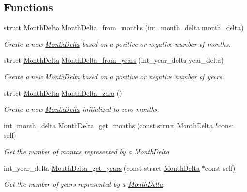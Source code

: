 \subsection*{\-Functions}
\begin{DoxyCompactItemize}
\item 
struct \hyperlink{structMonthDelta}{\-Month\-Delta} \hyperlink{month-delta_8h_ab2435ae92655bed23406d37b4b8f4750}{\-Month\-Delta\-\_\-from\-\_\-months} (int\-\_\-month\-\_\-delta month\-\_\-delta)
\begin{DoxyCompactList}\small\item\em \-Create a new \hyperlink{structMonthDelta}{\-Month\-Delta} based on a positive or negative number of months. \end{DoxyCompactList}\item 
struct \hyperlink{structMonthDelta}{\-Month\-Delta} \hyperlink{month-delta_8h_aec5607ad9e7e090c39b2f50a68974ef0}{\-Month\-Delta\-\_\-from\-\_\-years} (int\-\_\-year\-\_\-delta year\-\_\-delta)
\begin{DoxyCompactList}\small\item\em \-Create a new \hyperlink{structMonthDelta}{\-Month\-Delta} based on a positive or negative number of years. \end{DoxyCompactList}\item 
struct \hyperlink{structMonthDelta}{\-Month\-Delta} \hyperlink{month-delta_8h_aca81ef97d8ec1cd052ab391636f16bf7}{\-Month\-Delta\-\_\-zero} ()
\begin{DoxyCompactList}\small\item\em \-Create a new \hyperlink{structMonthDelta}{\-Month\-Delta} initialized to zero months. \end{DoxyCompactList}\item 
int\-\_\-month\-\_\-delta \hyperlink{month-delta_8h_aa01811194746354457e2b5e7a70dd59d}{\-Month\-Delta\-\_\-get\-\_\-months} (const struct \hyperlink{structMonthDelta}{\-Month\-Delta} $\ast$const self)
\begin{DoxyCompactList}\small\item\em \-Get the number of months represented by a \hyperlink{structMonthDelta}{\-Month\-Delta}. \end{DoxyCompactList}\item 
int\-\_\-year\-\_\-delta \hyperlink{month-delta_8h_a37279655ebb7be159cdf2fcfbf460348}{\-Month\-Delta\-\_\-get\-\_\-years} (const struct \hyperlink{structMonthDelta}{\-Month\-Delta} $\ast$const self)
\begin{DoxyCompactList}\small\item\em \-Get the number of years represented by a \hyperlink{structMonthDelta}{\-Month\-Delta}. \end{DoxyCompactList}\item 

\end{DoxyCompactItemize}
